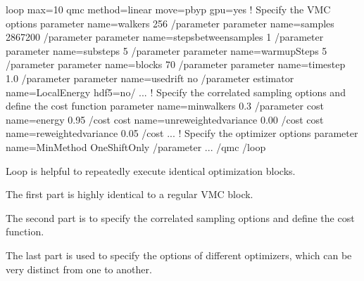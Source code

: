 \documentclass[letterpaper,10pt,english]{sphinxmanual}
\begin{document}
\begin{sphinxVerbatim}[commandchars=\\\{\}]
\PYGZlt{}loop max=\PYGZdq{}10\PYGZdq{}\PYGZgt{}
 \PYGZlt{}qmc method=\PYGZdq{}linear\PYGZdq{} move=\PYGZdq{}pbyp\PYGZdq{} gpu=\PYGZdq{}yes\PYGZdq{}\PYGZgt{}
   \PYGZlt{}!\PYGZhy{}\PYGZhy{} Specify the VMC options \PYGZhy{}\PYGZhy{}\PYGZgt{}
   \PYGZlt{}parameter name=\PYGZdq{}walkers\PYGZdq{}\PYGZgt{}              256 \PYGZlt{}/parameter\PYGZgt{}
   \PYGZlt{}parameter name=\PYGZdq{}samples\PYGZdq{}\PYGZgt{}          2867200 \PYGZlt{}/parameter\PYGZgt{}
   \PYGZlt{}parameter name=\PYGZdq{}stepsbetweensamples\PYGZdq{}\PYGZgt{}    1 \PYGZlt{}/parameter\PYGZgt{}
   \PYGZlt{}parameter name=\PYGZdq{}substeps\PYGZdq{}\PYGZgt{}               5 \PYGZlt{}/parameter\PYGZgt{}
   \PYGZlt{}parameter name=\PYGZdq{}warmupSteps\PYGZdq{}\PYGZgt{}            5 \PYGZlt{}/parameter\PYGZgt{}
   \PYGZlt{}parameter name=\PYGZdq{}blocks\PYGZdq{}\PYGZgt{}                70 \PYGZlt{}/parameter\PYGZgt{}
   \PYGZlt{}parameter name=\PYGZdq{}timestep\PYGZdq{}\PYGZgt{}             1.0 \PYGZlt{}/parameter\PYGZgt{}
   \PYGZlt{}parameter name=\PYGZdq{}usedrift\PYGZdq{}\PYGZgt{}              no \PYGZlt{}/parameter\PYGZgt{}
   \PYGZlt{}estimator name=\PYGZdq{}LocalEnergy\PYGZdq{} hdf5=\PYGZdq{}no\PYGZdq{}/\PYGZgt{}
   ...
   \PYGZlt{}!\PYGZhy{}\PYGZhy{} Specify the correlated sampling options and define the cost function \PYGZhy{}\PYGZhy{}\PYGZgt{}
   \PYGZlt{}parameter name=\PYGZdq{}minwalkers\PYGZdq{}\PYGZgt{}            0.3 \PYGZlt{}/parameter\PYGZgt{}
        \PYGZlt{}cost name=\PYGZdq{}energy\PYGZdq{}\PYGZgt{}               0.95 \PYGZlt{}/cost\PYGZgt{}
        \PYGZlt{}cost name=\PYGZdq{}unreweightedvariance\PYGZdq{}\PYGZgt{} 0.00 \PYGZlt{}/cost\PYGZgt{}
        \PYGZlt{}cost name=\PYGZdq{}reweightedvariance\PYGZdq{}\PYGZgt{}   0.05 \PYGZlt{}/cost\PYGZgt{}
   ...
   \PYGZlt{}!\PYGZhy{}\PYGZhy{} Specify the optimizer options \PYGZhy{}\PYGZhy{}\PYGZgt{}
   \PYGZlt{}parameter name=\PYGZdq{}MinMethod\PYGZdq{}\PYGZgt{}    OneShiftOnly \PYGZlt{}/parameter\PYGZgt{}
   ...
 \PYGZlt{}/qmc\PYGZgt{}
\PYGZlt{}/loop\PYGZgt{}

\PYGZhy{}  Loop is helpful to repeatedly execute identical optimization blocks.

\PYGZhy{}  The first part is highly identical to a regular VMC block.

\PYGZhy{}  The second part is to specify the correlated sampling options and
   define the cost function.

\PYGZhy{}  The last part is used to specify the options of different optimizers,
   which can be very distinct from one to another.
\end{sphinxVerbatim}
\end{document}
